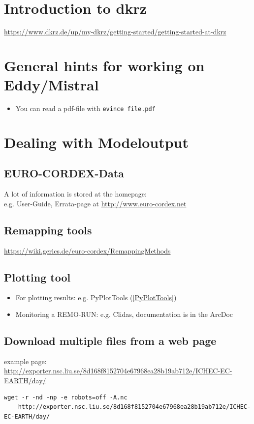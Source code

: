 \section{Introduction to dkrz}
\url{https://www.dkrz.de/up/my-dkrz/getting-started/getting-started-at-dkrz}

\section{General hints for working on Eddy/Mistral}
\begin{itemize}
 \item You can read a pdf-file with \texttt{evince file.pdf} 
\end{itemize}

\section{Dealing with Modeloutput}

\subsection{EURO-CORDEX-Data}
A lot of information is stored at the homepage:\\
e.g. User-Guide, Errata-page at \url{http://www.euro-cordex.net}

\subsection{Remapping tools}
\url{https://wiki.gerics.de/euro-cordex/RemappingMethods}

\subsection{Plotting tool}
\begin{itemize}
 \item For plotting results: e.g. PyPlotTools (\ref{PyPlotTools}) 
 
 \item Monitoring a REMO-RUN: e.g. Clidas, documentation is in the ArcDoc
\end{itemize}
\subsection{Download multiple files from a web page}

example page: \url{http://exporter.nsc.liu.se/8d168f8152704e67968ea28b19ab712e/ICHEC-EC-EARTH/day/}
{\small 
\begin{verbatim}
wget -r -nd -np -e robots=off -A.nc 
    http://exporter.nsc.liu.se/8d168f8152704e67968ea28b19ab712e/ICHEC-EC-EARTH/day/
\end{verbatim}}

